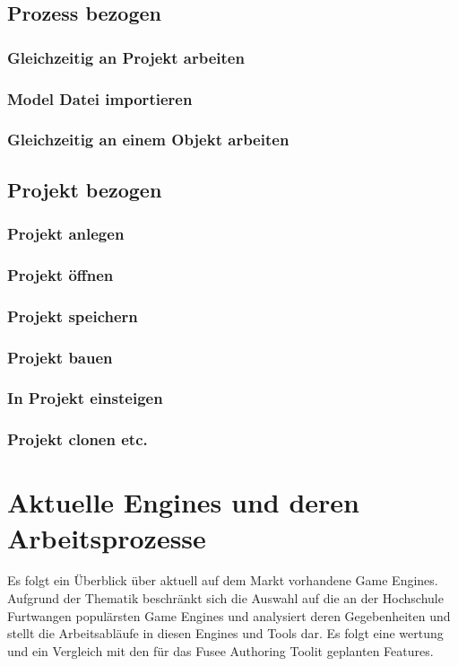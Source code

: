 \documentclass[pagesize, paper=a4, fontsize=12pt,titlepage=true, headings=small, headnosepline, abstractoff, liststotoc, nochapterprefix, plainheadsepline, twoside]{scrreprt}
\begin{document}
\subsection{Prozess bezogen}
\subsubsection{Gleichzeitig an Projekt arbeiten}
\subsubsection{Model Datei importieren}
\subsubsection{Gleichzeitig an einem Objekt arbeiten}

\subsection{Projekt bezogen}
\subsubsection{Projekt anlegen}
\subsubsection{Projekt öffnen}
\subsubsection{Projekt speichern}
\subsubsection{Projekt bauen}
\subsubsection{In Projekt einsteigen}
\subsubsection{Projekt clonen etc.}

\section{Aktuelle Engines und deren Arbeitsprozesse}
Es folgt ein Überblick über aktuell auf dem Markt vorhandene Game Engines. Aufgrund der Thematik beschränkt sich die Auswahl auf die an der Hochschule Furtwangen populärsten Game Engines und analysiert deren Gegebenheiten und stellt die Arbeitsabläufe in diesen Engines und Tools dar. Es folgt eine wertung und ein Vergleich mit den für das Fusee Authoring Toolit geplanten Features.
\end{document}

